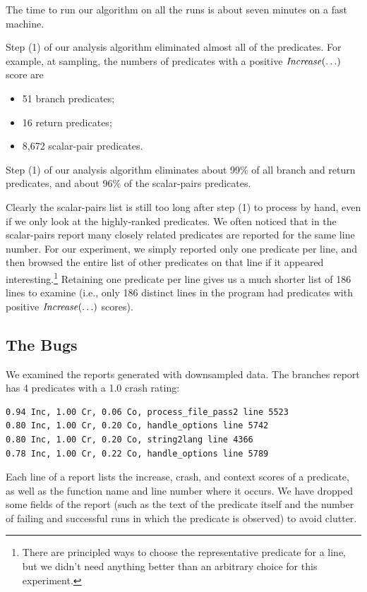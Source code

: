 The time to run our algorithm on all the runs is about seven minutes on
a fast machine.

Step (1) of our analysis algorithm eliminated almost all of the
predicates.  For example, at  sampling, the numbers
of predicates with a positive
$\mbox{\textit{Increase}}(\ldots)$ score are
\begin{itemize}
\item 51 branch predicates;

\item 16 return predicates;

\item 8,672 scalar-pair predicates.
\end{itemize}
Step (1) of our analysis algorithm eliminates about 99\% of
all branch and return predicates, and about 96\% of the scalar-pairs
predicates.

Clearly the scalar-pairs list is still too long after step (1) to
process by hand, even if we only look at the highly-ranked predicates.
We often noticed that in the scalar-pairs report many closely related
predicates are reported for the same line number.  For our experiment,
we simply reported only one predicate per line, and then browsed the
entire list of other predicates on that line if it appeared
interesting.\footnote{There are principled ways to choose the
representative predicate for a line, but we didn't need anything
better than an arbitrary choice for this experiment.}  Retaining one
predicate per line gives us a much shorter list of 186 lines to
examine (i.e., only 186 distinct lines in the program had predicates
with positive $\mbox{\textit{Increase}}(\ldots)$ scores).

\subsection{The Bugs}

We examined the reports generated with  downsampled data.
The branches report has 4 predicates with a 1.0 crash rating:
\begin{small}
\begin{verbatim}
0.94 Inc, 1.00 Cr, 0.06 Co, process_file_pass2 line 5523
0.80 Inc, 1.00 Cr, 0.20 Co, handle_options line 5742
0.80 Inc, 1.00 Cr, 0.20 Co, string2lang line 4366
0.78 Inc, 1.00 Cr, 0.22 Co, handle_options line 5789
\end{verbatim}
\end{small}

Each line of a report lists the increase, crash, and context scores of
a predicate, as well as the function name and line number where it
occurs.  We have dropped some fields of the report (such as the text
of the predicate itself and the number of failing and successful runs
in which the predicate is observed) to avoid clutter.

